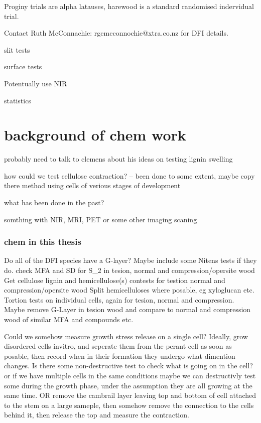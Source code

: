 \documentclass{article}
\begin{document}
Proginy trials are alpha latauses, harewood is a standard randomised indervidual trial.

Contact Ruth McConnachie: rgcmcconnochie@xtra.co.nz for DFI details.

slit tests

surface tests

Potentually use NIR

statistics

\section{background of chem work}

probably need to talk to clemens about his ideas on testing lignin swelling

how could we test cellulose contraction? -- been done to some extent, maybe copy there method using cells of verious stages of development

what has been done in the past?

somthing with NIR, MRI, PET or some other imaging scaning

\subsubsection{chem in this thesis}

Do all of the DFI species have a G-layer?
Maybe include some Nitens tests if they do.
check MFA and SD for S\_2 in tesion, normal and compression/opersite wood
Get cellulose lignin and hemicellulose(s) contests for testion normal and compression/opersite wood
    Split hemicelluloses where posable, eg xyloglucan etc.
Tortion tests on individual cells, again for tesion, normal and compression. Maybe remove G-Layer in tesion wood and compare to normal and compression wood of similar MFA and compounds etc.

Could we somehow measure growth stress release on a single cell?
Ideally, grow disordered cells invitro, and seperate them from the perant cell as soon as posable, then record when in their formation they undergo what dimention changes. Is there some non-destructive test to check what is going on in the cell? or if we have multiple cells in the same conditions maybe we can destructivly test some during the growth phase, under the assumption they are all growing at the same time.
OR
remove the cambrail layer leaving top and bottom of cell attached to the stem on a large sameple, then somehow remove the connection to the cells behind it, then release the top and measure the contraction.
\end{document}
